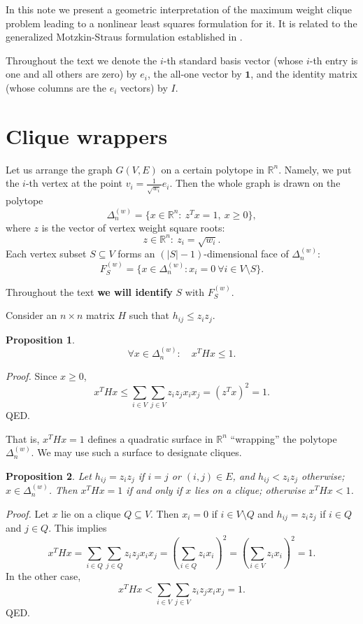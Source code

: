 \documentclass[11pt]{article}
\newtheorem{prop}{Proposition}
\begin{document}
In this note we present a geometric interpretation of the maximum weight
clique problem leading to a nonlinear least squares formulation for it. It
is related to the generalized Motzkin-Straus formulation established in
\cite{B02}.

Throughout the text we denote the $i$-th standard basis vector (whose
$i$-th entry is one and all others are zero) by $e_i$, the all-one vector by
$\mathbf{1}$, and the identity matrix (whose columns are the $e_i$
vectors) by $I$.

\section{Clique wrappers}
Let us arrange the graph $G(V,E)$ on a certain polytope in $\mathbb{R}^n$.
Namely, we put the $i$-th vertex at the point $v_i=\frac{1}{\sqrt{w_i}} e_i$.
Then the whole graph is drawn on the polytope
\begin{equation}
\label{eq:simplex}
\Delta^{(w)}_n = \{x \in \mathbb{R}^n : \ z^T x = 1, \ x \geq 0\},
\end{equation}
where $z$ is the vector of vertex weight square roots:
\begin{equation}
\label{eq:sqrtw}
z \in \mathbb{R}^n: \ z_i = \sqrt{w_i}.
\end{equation}
Each vertex subset $S \subseteq V$ forms an $(|S|-1)$-dimensional face of
$\Delta^{(w)}_n$:
\[ F^{(w)}_S = \{x \in \Delta^{(w)}_n : x_i=0 \ \forall i \in V \setminus S \}. \]

Throughout the text {\bf we will identify} $S$ with $F^{(w)}_S$.

Consider an $n \times n$ matrix $H$ such that $h_{ij} \leq z_i z_j$.
\begin{prop}
\label{prop:weakwrap}
\begin{equation}
\forall x \in \Delta^{(w)}_n: \quad x^T H x \leq 1.
\end{equation}
\end{prop}
{\em Proof.} Since $x \geq 0$,
\[ x^T H x \leq \sum_{i \in V} \sum_{j \in V} z_i z_j x_i x_j = (z^T x)^2 = 1. \]
QED.

\vspace{1pc}

That is, $x^T H x = 1$ defines a quadratic surface in $\mathbb{R}^n$
``wrapping'' the polytope $\Delta^{(w)}_n$. We may use such a surface to
designate cliques.
\begin{prop}
\label{prop:wrap}
Let $h_{ij} = z_i z_j$ if $i=j$ or $(i,j) \in E$, and $h_{ij} < z_i z_j$
otherwise; $x \in \Delta^{(w)}_n$. Then $x^T H x = 1$ if and only if $x$ lies
on a clique; otherwise $x^T H x < 1$.
\end{prop}
{\em Proof.} Let $x$ lie on a clique $Q \subseteq V$. Then $x_i=0$ if
$i \in V \setminus Q$ and $h_{ij} = z_i z_j$ if $i \in Q$ and $j \in Q$. This
implies
\[ x^T H x = \sum_{i \in Q} \sum_{j \in Q} z_i z_j x_i x_j =
\left( \sum_{i \in Q} z_i x_i \right)^2 =
\left( \sum_{i \in V} z_i x_i \right)^2 = 1. \]
In the other case,
\[ x^T H x < \sum_{i \in V} \sum_{j \in V} z_i z_j x_i x_j = 1. \]
QED.
\end{document}
